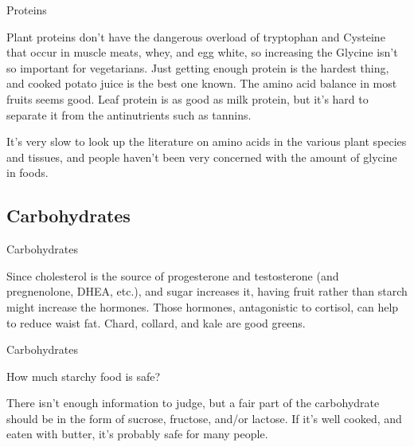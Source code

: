 \documentclass[11pt,oneside,openany,extrafontsizes]{memoir}
\begin{document}
\begin{standalonequote}{Proteins}

    \begin{answer}
       Plant proteins don't have the dangerous overload of tryptophan and Cysteine that occur in muscle meats, whey, and egg white, so increasing the Glycine isn't so important for vegetarians. Just getting enough protein is the hardest thing, and cooked potato juice is the best one known. The amino acid balance in most fruits seems good. Leaf protein is as good as milk protein, but it's hard to separate it from the antinutrients such as tannins.

      It's very slow to look up the literature on amino acids in the various plant species and tissues, and people haven't been very concerned with the amount of glycine in foods.
    \end{answer}
\end{standalonequote}

\subsection{Carbohydrates}

\begin{standalonequote}{Carbohydrates}

    \begin{answer}
        Since cholesterol is the source of progesterone and testosterone (and pregnenolone, DHEA, etc.), and sugar increases it, having fruit rather than starch might increase the hormones. Those hormones, antagonistic to cortisol, can help to reduce waist fat. Chard, collard, and kale are good greens.
    \end{answer}
\end{standalonequote}

\begin{qaexchange}{Carbohydrates}

    \begin{question}
        How much starchy food is safe?
    \end{question}

    \begin{answer}
        There isn't enough information to judge, but a fair part of the carbohydrate should be in the form of sucrose, fructose, and/or lactose. If it's well cooked, and eaten with butter, it's probably safe for many people.
    \end{answer}
\end{qaexchange}
\end{document}
